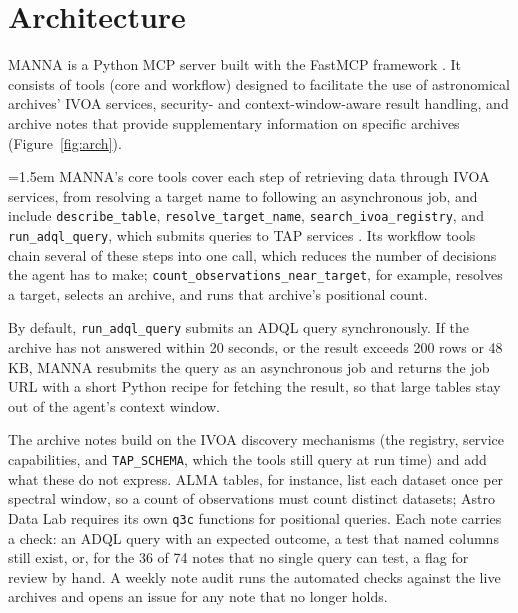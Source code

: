 \documentclass[11pt,twoside]{article}
\begin{document}
\section{Architecture}
\label{sec:arch}
MANNA is a Python MCP server built with the FastMCP framework \citep{fastmcp}. It consists of tools (core and workflow) designed to facilitate the use of astronomical archives' IVOA services, security- and context-window-aware result handling, and archive notes that provide supplementary information on specific archives (Figure~\ref{fig:arch}).


{\emergencystretch=1.5em MANNA's core tools cover each step of retrieving data through IVOA services, from resolving a target name to following an asynchronous job, and include \texttt{describe\_table}, \texttt{resolve\_target\_name}, \texttt{search\_ivoa\_registry}, and \texttt{run\_adql\_query}, which submits queries to TAP services \citep{2019ivoa.spec.0927D}. Its workflow tools chain several of these steps into one call, which reduces the number of decisions the agent has to make; \texttt{count\_\allowbreak observations\_\allowbreak near\_target}, for example, resolves a target, selects an archive, and runs that archive's positional count.\par}

By default, \texttt{run\_adql\_query} submits an ADQL query \citep{2023ivoa.spec.1215M} synchronously. If the archive has not answered within 20 seconds, or the result exceeds 200 rows or 48\,KB, MANNA resubmits the query as an asynchronous job and returns the job URL with a short Python recipe for fetching the result, so that large tables stay out of the agent's context window.

The archive notes build on the IVOA discovery mechanisms (the registry, service capabilities, and \texttt{TAP\_SCHEMA}, which the tools still query at run time) and add what these do not express. ALMA tables, for instance, list each dataset once per spectral window, so a count of observations must count distinct data\-sets; Astro Data Lab requires its own \texttt{q3c} functions for positional queries. Each note carries a check: an ADQL query with an expected outcome, a test that named columns still exist, or, for the 36 of 74 notes that no single query can test, a flag for review by hand. A weekly note audit runs the automated checks against the live archives and opens an issue for any note that no longer holds.
\end{document}
